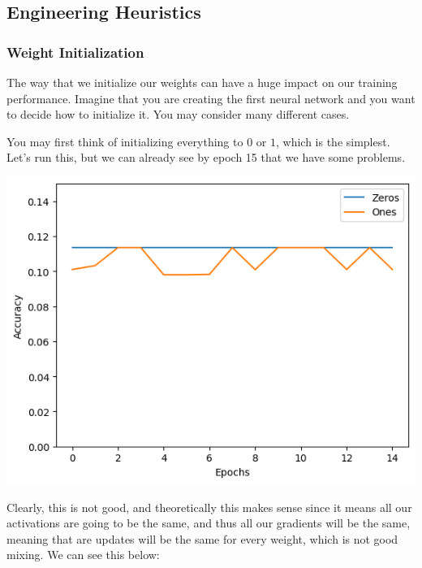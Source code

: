 \subsection{Engineering Heuristics}

  \subsubsection{Weight Initialization}

    The way that we initialize our weights can have a huge impact on our training performance. Imagine that you are creating the first neural network and you want to decide how to initialize it. You may consider many different cases. 

    \begin{example}
      You may first think of initializing everything to $0$ or $1$, which is the simplest. Let's run this, but we can already see by epoch 15 that we have some problems. 
      \begin{center}
        \includegraphics[scale=0.5]{img/01_MLP/first_initialize.png}
      \end{center}
      Clearly, this is not good, and theoretically this makes sense since it means all our activations are going to be the same, and thus all our gradients will be the same, meaning that are updates will be the same for every weight, which is not good mixing. We can see this below: 
    \end{example}

